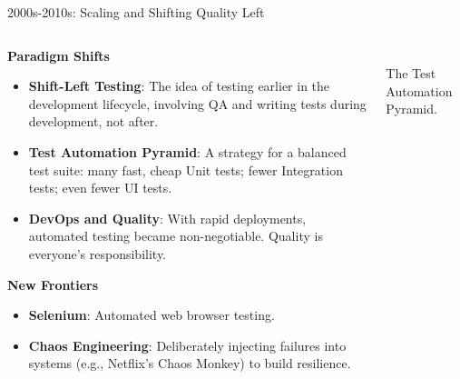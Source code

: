 \documentclass{beamer}
\begin{document}
\begin{frame}{2000s-2010s: Scaling and Shifting Quality Left}
\begin{columns}
    \begin{column}{0.6\textwidth}
        \textbf{Paradigm Shifts}
        \begin{itemize}
            \item \textbf{Shift-Left Testing}: The idea of testing earlier in the development lifecycle, involving QA and writing tests during development, not after.
            \item \textbf{Test Automation Pyramid}: A strategy for a balanced test suite: many fast, cheap Unit tests; fewer Integration tests; even fewer UI tests.
            \item \textbf{DevOps and Quality}: With rapid deployments, automated testing became non-negotiable. Quality is everyone's responsibility.
        \end{itemize}
        \textbf{New Frontiers}
        \begin{itemize}
            \item \textbf{Selenium}: Automated web browser testing.
            \item \textbf{Chaos Engineering}: Deliberately injecting failures into systems (e.g., Netflix's Chaos Monkey) to build resilience.
        \end{itemize}
    \end{column}
    \begin{column}{0.4\textwidth}
        \\\scriptsize{The Test Automation Pyramid.}
    \end{column}
\end{columns}
\end{frame}
\end{document}
